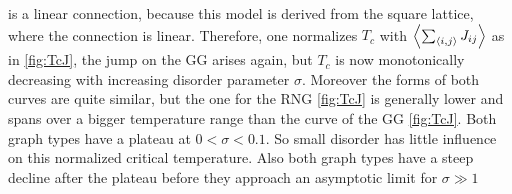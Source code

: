     is a linear connection, because this model is derived from the
    square lattice, where the connection is linear. Therefore, one
    normalizes \(T_c\) with \(\left< \sum_{\left< i,j \right>} J_{ij} \right>\) as in
    \ref{fig:TcJ}, the
    jump on the GG arises again, but \(T_c\) is now monotonically
    decreasing with increasing disorder parameter \(\sigma\).
    Moreover the forms of both curves are quite similar, but the
    one for the RNG \ref{fig:TcJ}
    is generally lower and spans over a bigger temperature range than
    the curve of the GG \ref{fig:TcJ}.
    Both graph types have a plateau at \(0 < \sigma < 0.1\). So small
    disorder has little influence on this normalized critical temperature.
    Also both graph types have a steep decline after the plateau before
    they approach an asymptotic limit for \(\sigma \gg 1\)\\\\

